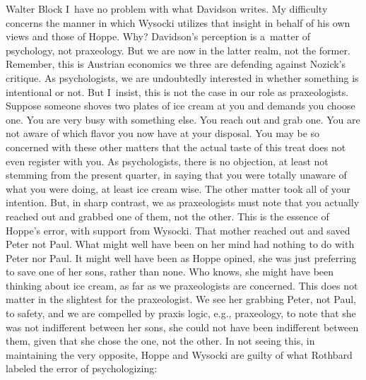 \begin{artengenv}{Walter Block}
I~have no problem with what Davidson writes. My difficulty concerns the manner in which Wysocki utilizes that insight in behalf of his own views and those of Hoppe. Why? Davidson's perception is a~matter of psychology, not praxeology. But we are now in the latter realm, not the former. Remember, this is Austrian economics we three are defending against Nozick's critique. As psychologists, we are undoubtedly interested in whether something is intentional or not. But I~insist, this is not the case in our role as praxeologists. Suppose someone shoves two plates of ice cream at you and demands you choose one. You are very busy with something else. You reach out and grab one. You are not aware of which flavor you now have at your disposal. You may be so concerned with these other matters that the actual taste of this treat does not even register with you. As psychologists, there is no objection, at least not stemming from the present quarter, in saying that you were totally unaware of what you were doing, at least ice cream wise. The other matter took all of your intention. But, in sharp contrast, we as praxeologists must note that you actually reached out and grabbed one of them, not the other. This is the essence of Hoppe's error, with support from Wysocki. That mother reached out and saved Peter not Paul. What might well have been on her mind had nothing to do with Peter nor Paul. It might well have been as Hoppe opined, she was just preferring to save one of her sons, rather than none. Who knows, she might have been thinking about ice cream, as far as we praxeologists are concerned. This does not matter in the slightest for the praxeologist. We see her grabbing Peter, not Paul, to safety, and we are compelled by praxis logic, e.g., praxeology, to note that she was not indifferent between her sons, she could not have been indifferent between them, given that she chose the one, not the other. In not seeing this, in maintaining the very opposite, Hoppe and Wysocki are guilty of what Rothbard
\parencite*[][]{rothbard_toward_2011} %
 labeled the error of psychologizing:



\end{artengenv}
